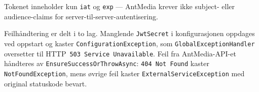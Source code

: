 Tokenet inneholder kun \texttt{iat} og \texttt{exp} --- AntMedia krever ikke subject- eller audience-claims for server-til-server-autentisering.

Feilhåndtering er delt i to lag. Manglende \texttt{JwtSecret} i konfigurasjonen oppdages ved oppstart og kaster \texttt{ConfigurationException}, som \texttt{GlobalExceptionHandler} oversetter til HTTP~\texttt{503 Service Unavailable}. Feil fra AntMedia-API-et håndteres av \texttt{EnsureSuccessOrThrowAsync}: \texttt{404 Not Found} kaster \texttt{NotFoundException}, mens øvrige feil kaster \texttt{ExternalServiceException} med original statuskode bevart.
